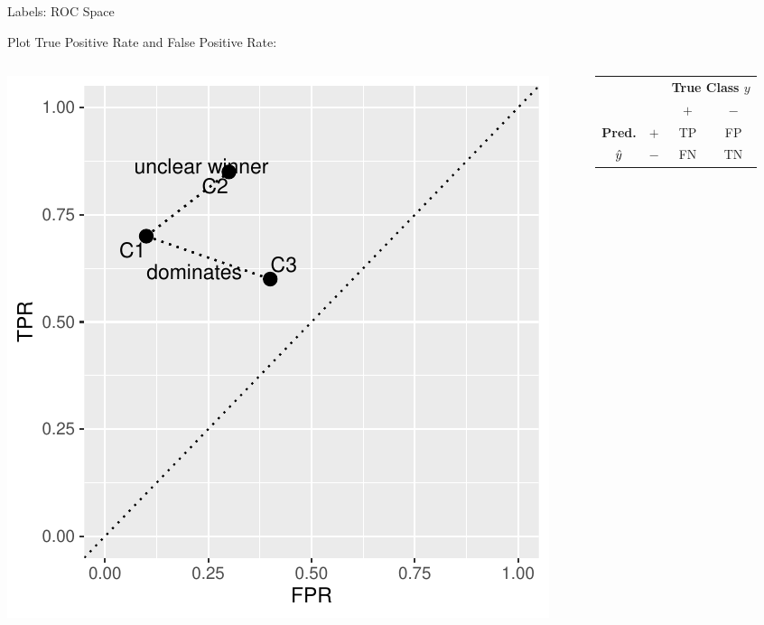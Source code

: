 \documentclass[11pt,compress,t,notes=noshow, xcolor=table]{beamer}
\newenvironment{knitrout}{}{} %
\begin{document}
\begin{vbframe}{Labels: ROC Space}


Plot True Positive Rate and False Positive Rate:
\begin{columns}
\begin{column}{0.5\textwidth}

\begin{knitrout}\scriptsize
{}\color{fgcolor}

{\centering \includegraphics[width=\textwidth]{figure/eval_mclass_roc_sp_1} 

}



\end{knitrout}

\end{column}
\begin{column}{0.5\textwidth} 

\begin{center}
\small
\begin{tabular}{cc|cc}
    & & \multicolumn{2}{c}{\bfseries True Class $y$} \\
    & & $+$ & $-$ \\
    \hline
    \bfseries Pred.     & $+$ & TP & FP \\
              $\hat{y}$ & $-$ & FN & TN \\
\end{tabular}


\end{center}
\end{column}
\end{columns}
\end{vbframe}
\end{document}
